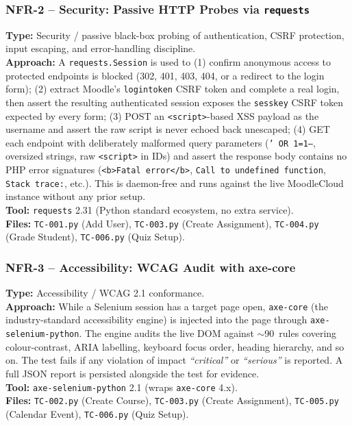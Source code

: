 \documentclass[twoside,final]{hcmut-report}
\begin{document}
\subsubsection{NFR-2 -- Security: Passive HTTP Probes via \texttt{requests}}
\textbf{Type:} Security / passive black-box probing of authentication, CSRF protection, input escaping, and error-handling discipline.\\
\textbf{Approach:} A \texttt{requests.Session} is used to (1) confirm anonymous access to protected endpoints is blocked (302, 401, 403, 404, or a redirect to the login form); (2) extract Moodle's \texttt{logintoken} CSRF token and complete a real login, then assert the resulting authenticated session exposes the \texttt{sesskey} CSRF token expected by every form; (3) POST an \texttt{<script>}-based XSS payload as the username and assert the raw script is never echoed back unescaped; (4) GET each endpoint with deliberately malformed query parameters (\texttt{' OR 1=1--}, oversized strings, raw \texttt{<script>} in IDs) and assert the response body contains no PHP error signatures (\texttt{<b>Fatal error</b>}, \texttt{Call to undefined function}, \texttt{Stack trace:}, etc.). This is daemon-free and runs against the live MoodleCloud instance without any prior setup.\\
\textbf{Tool:} \texttt{requests} 2.31 (Python standard ecosystem, no extra service).\\
\textbf{Files:} \texttt{TC-001.py} (Add User), \texttt{TC-003.py} (Create Assignment), \texttt{TC-004.py} (Grade Student), \texttt{TC-006.py} (Quiz Setup).

\subsubsection{NFR-3 -- Accessibility: WCAG Audit with axe-core}
\textbf{Type:} Accessibility / WCAG 2.1 conformance.\\
\textbf{Approach:} While a Selenium session has a target page open, \texttt{axe-core} (the industry-standard accessibility engine) is injected into the page through \texttt{axe-selenium-python}. The engine audits the live DOM against $\sim$90~rules covering colour-contrast, ARIA labelling, keyboard focus order, heading hierarchy, and so on. The test fails if any violation of impact \emph{``critical''} or \emph{``serious''} is reported. A full JSON report is persisted alongside the test for evidence.\\
\textbf{Tool:} \texttt{axe-selenium-python} 2.1 (wraps \texttt{axe-core} 4.x).\\
\textbf{Files:} \texttt{TC-002.py} (Create Course), \texttt{TC-003.py} (Create Assignment), \texttt{TC-005.py} (Calendar Event), \texttt{TC-006.py} (Quiz Setup).
\end{document}
